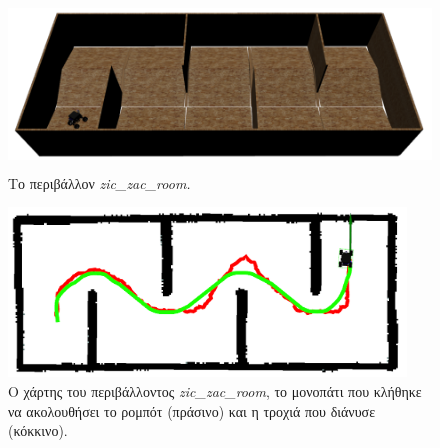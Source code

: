 \begin{figure}[!ht]
	\centering
	\includegraphics[height=4.5cm]{Chapters/Chapter5/Figures/ptc_experiments/zic_zac_room.png}
	\caption{Το περιβάλλον \textit{zic{\_}zac{\_}room.}}
	\label{fig:zic_zac_room}
\end{figure}	
	
\begin{figure}[!ht]
	\centering
	\includegraphics[height=4.5cm]{Chapters/Chapter5/Figures/ptc_experiments/zic_zac_room_path_and_traj.png}
	\caption{Ο χάρτης του περιβάλλοντος \textit{zic{\_}zac{\_}room}, το μονοπάτι που κλήθηκε να ακολουθήσει το ρομπότ (πράσινο) και η τροχιά που διάνυσε (κόκκινο).}
	\label{fig:zic_zac_room_path_and_traj}
\end{figure}

